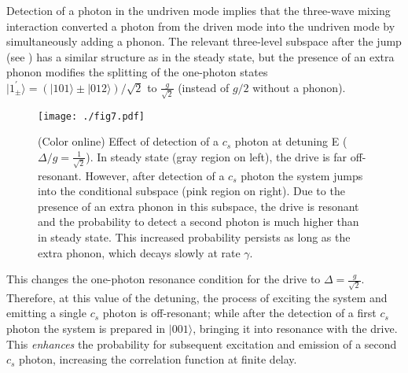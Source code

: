 Detection of a photon in the undriven mode
implies that the three-wave mixing interaction
converted a photon from the driven mode into
the undriven mode by simultaneously adding a phonon.
The relevant three-level subspace after the jump 
(see ) has a similar structure as in the steady state, 
but the presence of an extra phonon
modifies the splitting of the one-photon 
states $|1^\prime_{\pm}\rangle=(|101\rangle \pm |012\rangle)/\sqrt{2}$  to
$\frac{g}{\sqrt{2}}$ 
(instead of $g/2$ without a phonon).
%
\begin{figure}[htb]
\centering  
  \texttt{[image: ./fig7.pdf]}\\
  \caption{
  \label{fig:levels_jumps}(Color online)
  Effect of detection of a $c_s$ photon
  at detuning E ($\Delta/g = \frac{1}{\sqrt{2}}$).
  In steady state (gray region on left), 
  the drive is far off-resonant.
  However, after detection of a $c_s$ photon the system
  jumps into the conditional subspace (pink region on right).
  Due to the presence of an extra phonon in this subspace,
  the drive is resonant and the probability to detect a second
  photon is much higher than in steady state.
  This increased probability persists
  as long as the extra phonon,
  which decays slowly at rate $\gamma$.
  }
\end{figure}
This changes
the one-photon resonance condition
for the drive to $\Delta = \frac{g}{\sqrt{2}}$.
Therefore, at this value of the detuning,
the process of
exciting the system and emitting a single $c_s$ photon
is off-resonant;
while after the detection of a first $c_s$ photon
the system is prepared in $|001\rangle$, bringing
it into resonance with the drive.
This {\it enhances}
the probability for subsequent excitation and emission
of a second $c_s$ photon, increasing
the correlation function at finite delay.
